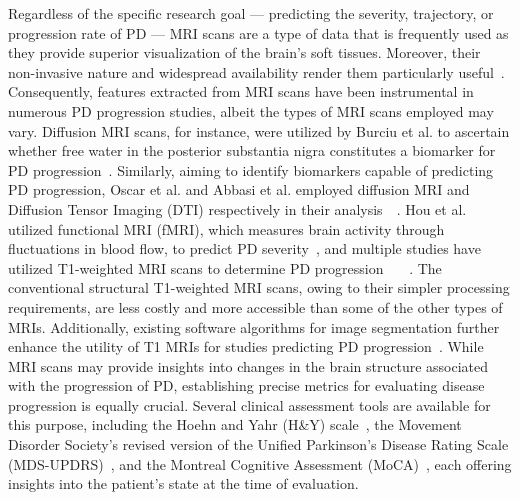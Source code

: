 Regardless of the specific research goal — predicting the severity, trajectory, or progression rate of PD — MRI scans are a type of data that is frequently used as they provide 
superior visualization of the brain's soft tissues. Moreover, their non-invasive nature and widespread availability render them particularly useful~\cite{a_jon_stoessl_wr_wayne_martin_mckeown_sossi_2011}. 
Consequently, features extracted from MRI scans have been instrumental in numerous PD progression studies, albeit the types of MRI scans employed may vary. Diffusion MRI scans, 
for instance, were utilized by Burciu et al. to ascertain whether free water in the posterior substantia nigra constitutes a biomarker for PD progression~\cite{burciu_ofori_archer_wu_pasternak_mcfarland_okun_vaillancourt_2017}. 
Similarly, aiming to identify biomarkers capable of predicting PD progression, Oscar et al. and Abbasi et al. employed diffusion MRI and Diffusion Tensor Imaging (DTI)
respectively in their analysis~\cite{oscar_pena_nogales_2019}~\cite{abbasi_seyed_mohammad_fereshtehnejad_yashar_zeighami_kevin_michel_herve_larcher_postuma_dagher_2020}. 
Hou et al. utilized functional MRI (fMRI), which measures brain activity through fluctuations in blood flow, to predict PD severity~\cite{hou_luo_yang_ou_song_wei_cao_zhao_wu_shang_et_al._2016}, and multiple studies 
have utilized T1-weighted MRI scans to determine PD progression~\cite{salmanpour_mojtaba_shamsaei_ghasem_hajianfar_hamid_soltanian_zadeh_arman_rahmim_2022}~\cite{shu2021predicting}
~\cite{wang_wu_brown_zhang_liu_han_zuo_cheng_feng_2022}. The conventional structural T1-weighted MRI scans, owing to their simpler processing requirements, are less costly and more accessible than some 
of the other types of MRIs. Additionally, existing software algorithms for image segmentation further enhance the utility of T1 MRIs for studies predicting PD progression~\cite{shu2021predicting}. 
While MRI scans may provide insights into changes in the brain structure associated with the progression of PD, establishing precise metrics for evaluating disease progression is 
equally crucial. Several clinical assessment tools are available for this purpose, including the Hoehn and Yahr (H\&Y) scale~\cite{hoehn_yahr_1998}, the Movement Disorder 
Society's revised version of the Unified Parkinson's Disease Rating Scale (MDS-UPDRS)~\cite{goetz_tilley_shaftman_stebbins_fahn_martinez-martin_poewe_sampaio_stern_dodel_et_al._2008}, 
and the Montreal Cognitive Assessment (MoCA)~\cite{nasreddine_phillips_valérie_bedirian_charbonneau_whitehead_collin_cummings_chertkow_2005}, each offering insights into the patient's state 
at the time of evaluation.

